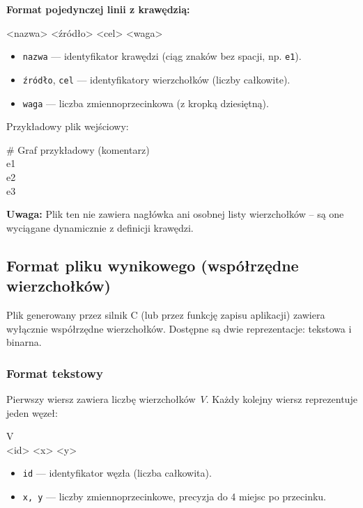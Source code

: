 \documentclass[a4paper, 11pt]{article}
\begin{document}
\textbf{Format pojedynczej linii z krawędzią:}

\begin{filebox}
<nazwa> <źródło> <cel> <waga>
\end{filebox}

\begin{itemize}
  \item \texttt{nazwa} --- identyfikator krawędzi (ciąg znaków bez spacji, np. \texttt{e1}).
  \item \texttt{źródło}, \texttt{cel} --- identyfikatory wierzchołków (liczby całkowite).
  \item \texttt{waga} --- liczba zmiennoprzecinkowa (z kropką dziesiętną).
\end{itemize}

Przykładowy plik wejściowy:
\begin{filebox}
\# Graf przykładowy (komentarz) \\
e1   \\
e2   \\
e3   
\end{filebox}

\textbf{Uwaga:} Plik ten nie zawiera nagłówka ani osobnej listy wierzchołków – są one wyciągane dynamicznie z definicji krawędzi.

\subsection{Format pliku wynikowego (współrzędne wierzchołków)}

Plik generowany przez silnik C (lub przez funkcję zapisu aplikacji) zawiera wyłącznie współrzędne wierzchołków. Dostępne są dwie reprezentacje: tekstowa i binarna.

\subsubsection{Format tekstowy}

Pierwszy wiersz zawiera liczbę wierzchołków~$V$. Każdy kolejny wiersz reprezentuje jeden węzeł:

\begin{filebox}
V\\
<id> <x> <y>
\end{filebox}

\begin{itemize}
  \item \texttt{id} --- identyfikator węzła (liczba całkowita).
  \item \texttt{x, y} --- liczby zmiennoprzecinkowe, precyzja do 4 miejsc po przecinku.
\end{itemize}
\end{document}
